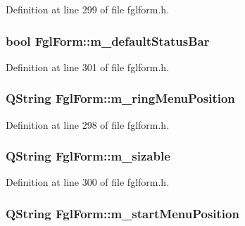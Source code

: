 Definition at line 299 of file fglform.h.

\hypertarget{classFglForm_a2e877386e4ba441d929c0c35d48620cb}{
\subsubsection[{m\_\-defaultStatusBar}]{\setlength{\rightskip}{0pt plus 5cm}bool {\bf FglForm::m\_\-defaultStatusBar}}}
\label{classFglForm_a2e877386e4ba441d929c0c35d48620cb}


Definition at line 301 of file fglform.h.

\hypertarget{classFglForm_a25371a3df6cb3e1dc66e141bb2a9dff1}{
\subsubsection[{m\_\-ringMenuPosition}]{\setlength{\rightskip}{0pt plus 5cm}QString {\bf FglForm::m\_\-ringMenuPosition}}}
\label{classFglForm_a25371a3df6cb3e1dc66e141bb2a9dff1}


Definition at line 298 of file fglform.h.

\hypertarget{classFglForm_a7861c07caeb306c5ae9f2012ce73bff7}{
\subsubsection[{m\_\-sizable}]{\setlength{\rightskip}{0pt plus 5cm}QString {\bf FglForm::m\_\-sizable}}}
\label{classFglForm_a7861c07caeb306c5ae9f2012ce73bff7}


Definition at line 300 of file fglform.h.

\hypertarget{classFglForm_a94e20a9c06c349d6e7c5ec47c03de4a6}{
\subsubsection[{m\_\-startMenuPosition}]{\setlength{\rightskip}{0pt plus 5cm}QString {\bf FglForm::m\_\-startMenuPosition}}}
\label{classFglForm_a94e20a9c06c349d6e7c5ec47c03de4a6}


